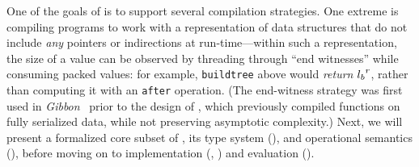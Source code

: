 \documentclass[showabstract,showacknowledgments,showpreface,showdedication]{iuphd}
\begin{document}
%

{One of the goals of \ourcalc{} is to support several compilation
  strategies. One extreme is compiling programs to work with a representation of
  data structures that do not include \emph{any} pointers or indirections at
  run-time---within such a representation, the size of a value can be observed
  by threading through ``end witnesses'' while consuming packed values: for
  example, \lstinline[mathescape]{buildtree} above would \emph{return} ${l_b}^{r}$, rather than computing
  it with an \lstinline[mathescape]{after} operation.
  (The end-witness strategy was first used in
  {\em Gibbon}~\cite{ecoop17-gibbon} prior to the design of \ourcalc{},
  which previously compiled functions on fully serialized data,
  while not preserving asymptotic complexity.)
}
%
%
%
%
Next, we will present a formalized core subset of \ourcalc, 
its type system (),
and operational semantics (),
before moving on to implementation (, )
and evaluation ().
\end{document}

